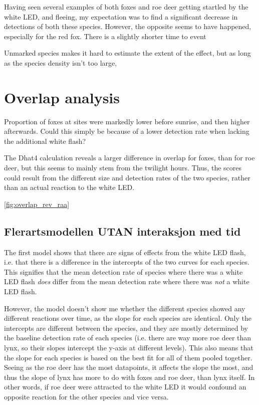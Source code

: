 Having seen several examples of both foxes and roe deer getting startled by the white LED, and fleeing, my expectation was to find a significant decrease in detections of both these species.
However, the opposite seems to have happened, especially for the red fox. There is a slightly shorter time to event


Unmarked species makes it hard to estimate the extent of the effect, but as long as the species density isn't too large, 



\section{Overlap analysis}

Proportion of foxes at sites were markedly lower before sunrise, and then higher afterwards. 
Could this simply be because of a lower detection rate when lacking the additional white flash? 

The Dhat4 calculation reveals a larger difference in overlap for foxes, than for roe deer, but this seems to mainly stem from the twilight hours. Thus, the scores could result from the different size and detection rates of the two species, rather than an actual reaction to the white LED.



\vref{fig:overlap_rev_raa}


\subsection{Flerartsmodellen UTAN interaksjon med tid}

The first model shows that there are signs of effects from the white LED flash, i.e. that there is a difference in the intercepts of the two curves for each species.
This signifies that the mean detection rate of species where there was a white LED flash \emph{does} differ from the mean detection rate where there was \emph{not} a white LED flash.

However, the model doesn't show me whether the different species showed any different reactions over time, as the slope for each species are identical. Only the intercepts are different between the species, and they are mostly determined by the baseline detection rate of each species (i.e. there are way more roe deer than lynx, so their slopes intercept the y-axis at different levels).
This also means that the slope for each species is based on the best fit for all of them pooled together.
Seeing as the roe deer has the most datapoints, it affects the slope the most, and thus the slope of lynx has more to do with foxes and roe deer, than lynx itself.  
In other words, if roe deer were attracted to the white LED it would confound an opposite reaction for the other species and vice versa.






